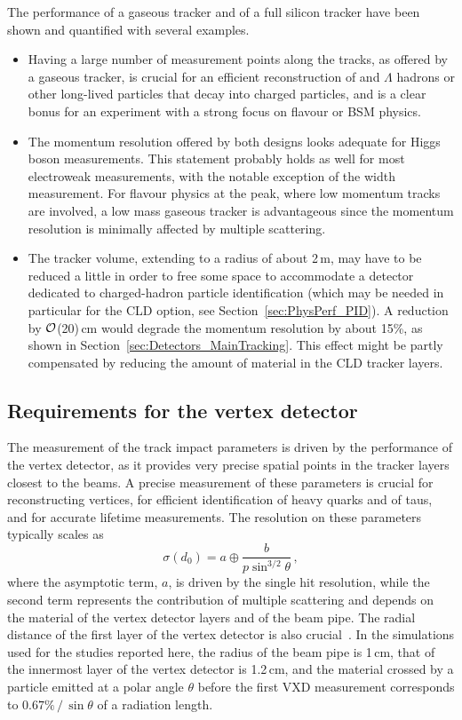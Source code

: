 The performance of a gaseous tracker and of a full silicon tracker have been shown and quantified with several examples. 
\begin{itemize}
\item Having a large number of measurement points along the tracks, as offered by a gaseous tracker, 
is crucial for an efficient reconstruction of \PKS and $\Lambda$ hadrons or other long-lived particles that decay into charged particles, 
and is a clear bonus for an experiment with a strong focus on flavour or BSM physics.
\item The momentum resolution offered by both designs looks adequate for Higgs boson measurements. 
This statement probably holds as well for most electroweak measurements, with the notable exception of the \PZ width measurement. 
For flavour physics at the \PZ peak, where low momentum tracks are involved, 
a low mass gaseous tracker is advantageous since the momentum resolution is minimally affected by multiple scattering.
\item The tracker volume, extending to a radius of about 2\,m, 
may have to be reduced a little in order to free some space to accommodate a detector dedicated to charged-hadron particle identification 
(which may be needed in particular for the CLD option, see Section~\ref{sec:PhysPerf_PID}). 
A reduction by ${\cal{O}}$(20)\,cm would degrade the momentum resolution by about 15\%, 
as shown in Section~\ref{sec:Detectors_MainTracking}.
This effect might be partly compensated by reducing the amount of material in the CLD tracker layers. 
\end{itemize}

\subsection{Requirements for the vertex detector}
\label{sec:PhysPerf:VXD}

The measurement of the track impact parameters is driven by the performance of the vertex detector, 
as it provides very precise spatial points in the tracker layers closest to the beams. 
A precise measurement of these parameters is crucial for reconstructing vertices, 
for efficient identification of heavy quarks and of taus, 
and for accurate lifetime measurements. 
The resolution on these parameters typically scales as
\begin{equation}
\sigma( d_0 ) = a \oplus \frac{b}{p \sin^{3/2} \theta} \, ,
\label{eq:track_impact_parameter}
\end{equation}
where the asymptotic term, $a$, is driven by the single hit resolution, 
while the second term represents the contribution of multiple scattering and depends on the material of the vertex detector layers and of the beam pipe. 
The radial distance of the first layer of the vertex detector is also crucial~\cite{Bedeschi:2022rnj}. 
In the simulations used for the studies reported here, the radius of the beam pipe is 1\,cm, 
that of the innermost layer of the vertex detector is 1.2\,cm, 
and the material crossed by a particle emitted at a polar angle $\theta$ before the first VXD measurement corresponds to $0.67 \% \, / \, \sin \theta$ of a radiation length.

